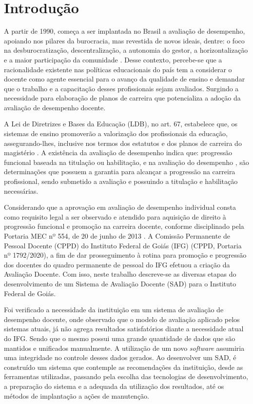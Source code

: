 \chapter{Introdução} \label{introdução}

    A partir de 1990, começa a ser implantada no Brasil a avaliação de desempenho, apoiando nos pilares da burocracia, mas revestida de novos ideais, dentre: o foco na desburocratização, descentralização, a autonomia do gestor, a horizontalização e a maior participação da comunidade \cite{bresser}. Desse contexto, percebe-se que a racionalidade existente nas políticas educacionais do país tem a considerar o docente como agente essencial para o avanço da qualidade de ensino e demandar que o trabalho e a capacitação desses profissionais sejam avaliados. Surgindo a necessidade para elaboração de planos de carreira que potencializa a adoção da avaliação de desempenho docente.

    A Lei de Diretrizes e Bases da Educação (LDB), no art. 67, estabelece que, os sistemas de ensino promoverão a valorização dos profissionais da educação, assegurando-lhes, inclusive nos termos dos estatutos e dos planos de carreira do magistério \cite{lei9394}. A existência da avaliação de desempenho indica que: progressão funcional baseada na titulação ou habilitação, e na avaliação do desempenho \cite{lei9394}, são determinações que possuem a garantia para alcançar a progressão na carreira profissional, sendo submetido a avaliação e possuindo a titulação e habilitação necessárias.

    Considerando que a aprovação em avaliação de desempenho individual consta como requisito legal a ser observado e atendido para aquisição de direito à progressão funcional e promoção na carreira docente, conforme disciplinado pela Portaria MEC nº 554, de 20 de junho de 2013 \cite{reitoria}. A Comissão Permanente de Pessoal Docente (CPPD) do Instituto Federal de Goiás (IFG) (CPPD, Portaria nº 1792/2020), a fim de dar prosseguimento à rotina para promoção e progressão dos docentes do quadro permanente de pessoal do IFG efetuou a criação da Avaliação Docente. Com isso, neste trabalho descreve-se as diversas etapas do desenvolvimento de um Sistema de Avaliação Docente (SAD) para o Instituto Federal de Goiás.

    Foi verificado a necessidade da instituição em um sistema de avaliação de desempenho docente, onde observado que o modelo de avaliação aplicado pelos sistemas atuais, já não agrega resultados satisfatórios diante a necessidade atual do IFG. Sendo que o mesmo possui uma grande quantidade de dados que são mantidos e unificados manualmente. A utilização de um novo \textit{software} assumiria uma integridade no controle desses dados gerados. Ao desenvolver um SAD, é construído um sistema que contemple as recomendações da instituição, desde as ferramentas utilizadas, passando pela escolha das tecnologias de desenvolvimento, a preparação do sistema e a adequada da utilização dos resultados, até os métodos de implantação a ações de manutenção.

